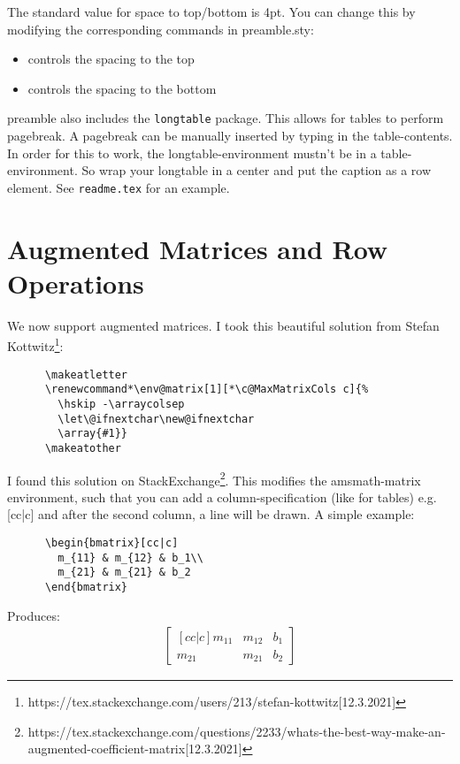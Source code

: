 \documentclass{report}
\begin{document}
    The standard value for space to top/bottom is 4pt. You can change this by modifying the corresponding commands
    in preamble.sty:
    \begin{itemize}
      \item \texttt{\setlength\cellspacetopline}  controls the spacing to the top
      \item \texttt{\setlength\cellspacebottomline} controls the spacing to the bottom
    \end{itemize}

    preamble also includes the \texttt{longtable} package. This allows for tables to perform pagebreak. A
    pagebreak can be manually inserted by typing \texttt{\pagebreak} in the table-contents. In order for
    this to work, the longtable-environment mustn't be in a table-environment. So wrap your longtable in
    a center and put the caption as a row element. See \texttt{readme.tex} for an example.
  \newpage
  \section{Augmented Matrices and Row Operations}
    We now support augmented matrices. I took this beautiful solution from 
    Stefan Kottwitz\footnote{https://tex.stackexchange.com/users/213/stefan-kottwitz[12.3.2021]}:
    \begin{verbatim}
      \makeatletter                                      
      \renewcommand*\env@matrix[1][*\c@MaxMatrixCols c]{%
        \hskip -\arraycolsep                             
        \let\@ifnextchar\new@ifnextchar                  
        \array{#1}}                                      
      \makeatother                                       
    \end{verbatim}
    I found this solution on 
    StackExchange\footnote{https://tex.stackexchange.com/questions/2233/whats-the-best-way-make-an-augmented-coefficient-matrix[12.3.2021]}. 
    This modifies the amsmath-matrix environment, such that you can add a column-specification (like for tables) e.g.
    [cc|c] and after the second column, a line will be drawn. A simple example:
    \begin{verbatim}
      \begin{bmatrix}[cc|c]
        m_{11} & m_{12} & b_1\\
        m_{21} & m_{21} & b_2
      \end{bmatrix}
    \end{verbatim}
    Produces:
    \begin{align*}
      \begin{bmatrix}[cc|c]
        m_{11} & m_{12} & b_1\\
        m_{21} & m_{21} & b_2
      \end{bmatrix}
    \end{align*}
\end{document}
